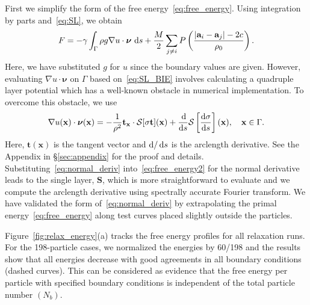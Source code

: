 \documentclass[prb,preprint,showpacs,preprintnumbers,amsmath,amssymb,longbibliography]{revtex4-1}
\renewcommand{\aa}{\mathbf{a}}
\newcommand{\DD}{\mathcal{D}}
\newcommand{\SSS}{\mathcal{S}}
\newcommand{\nnu}{\boldsymbol{\nu}}
\renewcommand{\SS}{\mathbf{S}}
\newcommand{\xx}{\mathbf{x}}
\renewcommand{\tt}{\mathbf{t}}
\begin{document}
First we simplify the form of the free energy~\eqref{eq:free_energy}.
Using integration by parts and~\eqref{eq:SL}, we obtain
\begin{equation}
\label{eq:free_energy2}
F = -\gamma
\int_{\Gamma} \rho g \nabla u \cdot \nnu \,\dif s
+ \frac{M}{2}
\sum_{j \neq i} 
P\left(\frac{|\aa_i - \aa_j|-2c}{\rho_0}\right).
\end{equation}
%
Here, we have substituted $g$ for $u$ since the boundary values are
given. However, evaluating $\nabla u \cdot \nnu$ on $\Gamma$ based
on~\eqref{eq:SL_BIE} involves calculating a quadruple layer potential
which has a well-known obstacle in numerical implementation.  To
overcome this obstacle, we use
%
\begin{equation}
\label{eq:normal_deriv}
\nabla u(\xx) \cdot \nnu(\xx)=
-\frac{1}{\rho^2} {\bf t}_\xx\cdot \SSS[\sigma{\bf t}](\xx)
+ \frac{\dif}{\dif s}\SSS\left[\frac{\dif \sigma}{\dif s}\right](\xx), \quad \xx \in \Gamma.
\end{equation}
%
Here, $\tt(\xx)$ is the tangent vector and $\dif/\dif s$ is the
arclength derivative. See the Appendix in \S\ref{sec:appendix} for the
proof and details. Substituting~\eqref{eq:normal_deriv}
into~\eqref{eq:free_energy2} for the normal derivative leads to the
single layer, $\SS$, which is more straightforward to evaluate and we
compute the arclength derivative using spectrally accurate Fourier
transform. We have validated the form of~\eqref{eq:normal_deriv} by
extrapolating the primal energy~\eqref{eq:free_energy} along test curves
placed slightly outside the particles.

Figure~\ref{fig:relax_energy}(a) tracks the free energy profiles for all
relaxation runs.  For the 198-particle cases, we normalized the energies
by 60/198 and the results show that all energies decrease with good
agreements in all boundary conditions (dashed curves).  This can be
considered as evidence that the free energy per particle with specified
boundary conditions is independent of the total particle number $(N_b)$.
\end{document}

